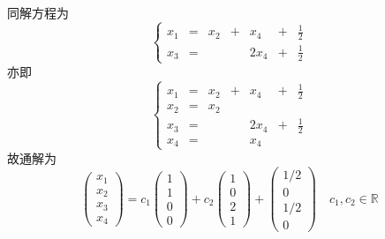 \begin{frame}
  \begin{footnotesize}
    同解方程为
    $$
    \left\{
    \begin{array}{rcrcrcr}
      x_1&=&x_2&+&x_4&+&\frac12\\[0.1in]
      x_3&=&&&2x_4&+&\frac12
    \end{array}
    \right.
    $$
    亦即
    $$
    \left\{
    \begin{array}{rcrcrcr}
      x_1&=&x_2&+&x_4&+&\frac12\\[0.1in]
      x_2&=&x_2&&&&\\[0.1in]
      x_3&=&&&2x_4&+&\frac12\\[0.1in]
      x_4&=&&&x_4&&
    \end{array}
    \right.
    $$
    故通解为
    $$
    \left(
    \begin{array}{c}
      x_1\\x_2\\x_3\\x_4
    \end{array}
    \right) = c_1    \left(
    \begin{array}{c}
      1\\1\\0\\0
    \end{array}
    \right)+c_2    \left(
    \begin{array}{c}
      1\\0\\2\\1
    \end{array}
    \right)+    \left(
    \begin{array}{c}
      1/2\\0\\1/2\\0
    \end{array}
    \right) \quad c_1,c_2\in\mathbb R
    $$

  \end{footnotesize}
\end{frame}

